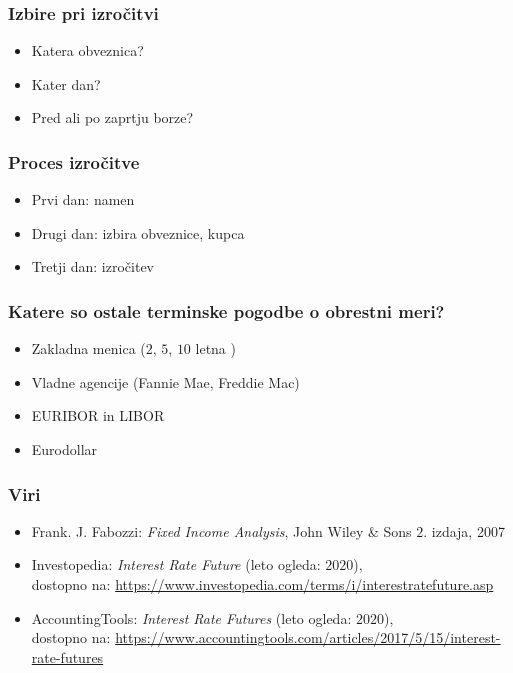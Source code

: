 \documentclass[14pt]{beamer}
\begin{document}
\begin{frame}
    \frametitle{Izbire pri izročitvi}
    
    \begin{itemize}
        \item Katera obveznica?
        \item Kater dan?
        \item Pred ali po zaprtju borze?
    \end{itemize}


\end{frame}


\begin{frame}
    \frametitle{Proces izročitve}
    
    \begin{itemize}
        \item Prvi dan: namen
        \item Drugi dan: izbira obveznice, kupca
        \item Tretji dan: izročitev
    \end{itemize}


\end{frame}


\begin{frame}
    \frametitle{Katere so ostale terminske pogodbe o obrestni meri?}
    
    \begin{itemize}
        \item Zakladna menica ($2$, $5$, $10$ letna )
        \item Vladne agencije (Fannie Mae, Freddie Mac)
        \item EURIBOR in LIBOR
        \item Eurodollar
    \end{itemize}


\end{frame}


\begin{frame}
    \frametitle{Viri}
    
    \begin{itemize}
        \item Frank. J. Fabozzi: \textit{Fixed Income Analysis}, John Wiley \& Sons $2$. izdaja, 2007
        \item Investopedia: \textit{Interest Rate Future} (leto ogleda: $2020$), \\
                dostopno na: \url{https://www.investopedia.com/terms/i/interestratefuture.asp}
        \item AccountingTools: \textit{Interest Rate Futures} (leto ogleda: $2020$), \\
                dostopno na: \url{https://www.accountingtools.com/articles/2017/5/15/interest-rate-futures}
    \end{itemize}

\end{frame}
\end{document}
